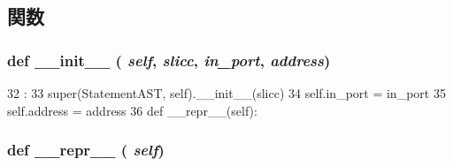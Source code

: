 \subsection{関数}
\hypertarget{classslicc_1_1ast_1_1StallAndWaitStatementAST_1_1StallAndWaitStatementAST_ac775ee34451fdfa742b318538164070e}{
\subsubsection[{\_\-\_\-init\_\-\_\-}]{\setlength{\rightskip}{0pt plus 5cm}def \_\-\_\-init\_\-\_\- ( {\em self}, \/   {\em slicc}, \/   {\em in\_\-port}, \/   {\em address})}}
\label{classslicc_1_1ast_1_1StallAndWaitStatementAST_1_1StallAndWaitStatementAST_ac775ee34451fdfa742b318538164070e}



\begin{DoxyCode}
32                                                :
33         super(StatementAST, self).__init__(slicc)
34         self.in_port = in_port
35         self.address = address
36         
    def __repr__(self):
\end{DoxyCode}
\hypertarget{classslicc_1_1ast_1_1StallAndWaitStatementAST_1_1StallAndWaitStatementAST_ad8b9328939df072e4740cd9a63189744}{
\subsubsection[{\_\-\_\-repr\_\-\_\-}]{\setlength{\rightskip}{0pt plus 5cm}def \_\-\_\-repr\_\-\_\- ( {\em self})}}
\label{classslicc_1_1ast_1_1StallAndWaitStatementAST_1_1StallAndWaitStatementAST_ad8b9328939df072e4740cd9a63189744}



